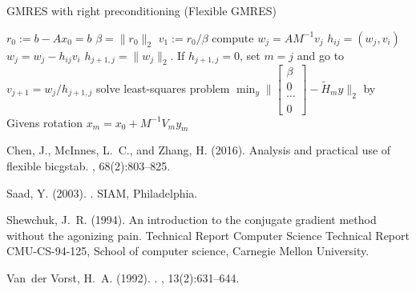 \documentclass[10pt]{article}
\begin{document}
\begin{algorithm}[H]
  \caption{GMRES with right preconditioning (Flexible GMRES)\citep[algorithm 9.5]{Saad_2003_IMS}}\label{alg:CG}
  \begin{algorithmic}[1]
    \State $r_0:=b-A x_0=b$
    \State $\beta=\|r_0\|_2$
    \State $v_1:=r_0/\beta$
    \State compute $w_j=AM^{-1}v_j$
        \State $h_{ij}=(w_j,v_i)$
        \State $w_j=w_j-h_{ij} v_i$
        \EndFor
    \State $h_{j+1,j}=\|w_j\|_2$. If $h_{j+1,j}=0$, set $m=j$ and go to
    \State $v_{j+1} = w_j/h_{j+1,j}$
    \State solve least-squares problem $\min_y\|\begin{bmatrix}
    \beta\\
    0\\
    \cdots\\
    0
    \end{bmatrix}- \tilde{H}_m y\|_2$ by Givens rotation
    \EndFor
    \State $x_m = x_0+M^{-1}V_m y_m$
  \end{algorithmic}
\end{algorithm}




%
\newcommand{\SortNoop}[1]{}
\begin{thebibliography}{}

Chen, J., McInnes, L.~C., and Zhang, H. (2016).
\newblock Analysis and practical use of flexible bicgstab.
, 68(2):803--825.

Saad, Y. (2003).
.
\newblock SIAM, Philadelphia.

Shewchuk, J.~R. (1994).
\newblock An introduction to the conjugate gradient method without the
  agonizing pain.
\newblock Technical Report Computer Science Technical Report CMU-CS-94-125,
  School of computer science, Carnegie Mellon University.

Van~der Vorst, H.~A. (1992).
.
,
  13(2):631--644.

\end{thebibliography}
\end{document}
